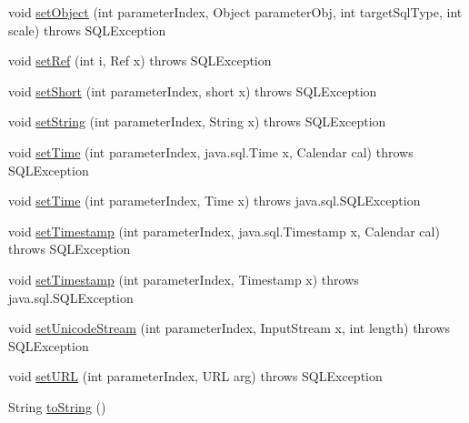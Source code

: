 \begin{DoxyCompactItemize}
\item 
void \mbox{\hyperlink{classcom_1_1mysql_1_1jdbc_1_1_prepared_statement_aee3c411b599fe20f669701c025cc7a90}{set\+Object}} (int parameter\+Index, Object parameter\+Obj, int target\+Sql\+Type, int scale)  throws S\+Q\+L\+Exception 
\item 
void \mbox{\hyperlink{classcom_1_1mysql_1_1jdbc_1_1_prepared_statement_ae89f89fcb2083ed1bc44a04a7a5757b4}{set\+Ref}} (int i, Ref x)  throws S\+Q\+L\+Exception 
\item 
void \mbox{\hyperlink{classcom_1_1mysql_1_1jdbc_1_1_prepared_statement_a9ed8cafd89fc66eb155892b62a006c38}{set\+Short}} (int parameter\+Index, short x)  throws S\+Q\+L\+Exception 
\item 
void \mbox{\hyperlink{classcom_1_1mysql_1_1jdbc_1_1_prepared_statement_a0a4c13284de8a0257085966284a41f1d}{set\+String}} (int parameter\+Index, String x)  throws S\+Q\+L\+Exception 
\item 
void \mbox{\hyperlink{classcom_1_1mysql_1_1jdbc_1_1_prepared_statement_a4a72d22c559a4a13dc93fc5343d8bc85}{set\+Time}} (int parameter\+Index, java.\+sql.\+Time x, Calendar cal)  throws S\+Q\+L\+Exception 
\item 
void \mbox{\hyperlink{classcom_1_1mysql_1_1jdbc_1_1_prepared_statement_a2edc3ed9d413dfc3dc612f8f27a6cf72}{set\+Time}} (int parameter\+Index, Time x)  throws java.\+sql.\+S\+Q\+L\+Exception 
\item 
void \mbox{\hyperlink{classcom_1_1mysql_1_1jdbc_1_1_prepared_statement_a6ae79298e06ce58b5e8acb9d8fd66e65}{set\+Timestamp}} (int parameter\+Index, java.\+sql.\+Timestamp x, Calendar cal)  throws S\+Q\+L\+Exception 
\item 
void \mbox{\hyperlink{classcom_1_1mysql_1_1jdbc_1_1_prepared_statement_acc2c80fd01dd1159ea8865da73016b8f}{set\+Timestamp}} (int parameter\+Index, Timestamp x)  throws java.\+sql.\+S\+Q\+L\+Exception 
\item 
void \mbox{\hyperlink{classcom_1_1mysql_1_1jdbc_1_1_prepared_statement_a60b5160c6f36f382f465cbe65a898638}{set\+Unicode\+Stream}} (int parameter\+Index, Input\+Stream x, int length)  throws S\+Q\+L\+Exception 
\item 
void \mbox{\hyperlink{classcom_1_1mysql_1_1jdbc_1_1_prepared_statement_a19011de47765abe0b12d60a3ad76ceb1}{set\+U\+RL}} (int parameter\+Index, U\+RL arg)  throws S\+Q\+L\+Exception 
\item 
String \mbox{\hyperlink{classcom_1_1mysql_1_1jdbc_1_1_prepared_statement_a21fa3680558df3800e15b9ee1a38ae70}{to\+String}} ()
\item 

\end{DoxyCompactItemize}
